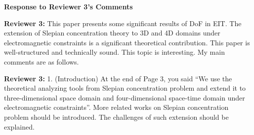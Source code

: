 \documentclass[a4paper,12pt]{article}
\begin{document}
{}

\clearpage 



\begin{center}
    {\Large\bf Response to Reviewer 3's Comments}
\end{center}

\textbf{Reviewer 3:}
This paper presents some significant results of DoF in EIT. The extension of Slepian concentration theory to 3D and 4D domains under electromagnetic constraints is a significant theoretical contribution. This paper is well-structured and technically sound. This topic is interesting. My main comments are as follows.

{}

\textbf{Reviewer 3:}
1. (Introduction) At the end of Page 3, you said “We use the theoretical analyzing tools from Slepian concentration problem and extend it to three-dimensional space domain and four-dimensional space-time domain under electromagnetic constraints”. More related works on Slepian concentration problem should be introduced. The challenges of such extension should be explained.
\end{document}
